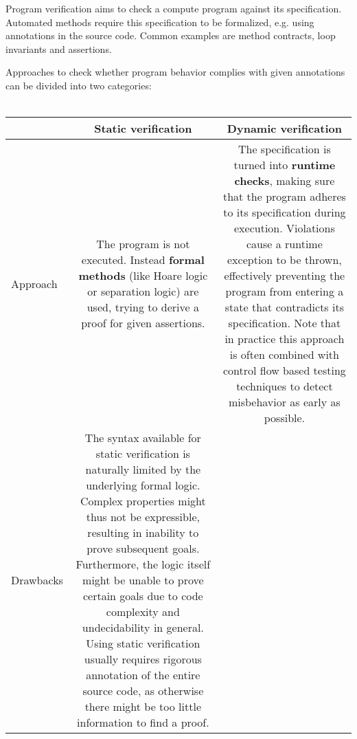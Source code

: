 Program verification aims to check a compute program against its specification.
Automated methods require this specification to be formalized, e.g. using annotations in the source code.
Common examples are method contracts, loop invariants and assertions.

Approaches to check whether program behavior complies with given annotations can be divided into two categories:\\~\\
\begin{tabular}{l | c | c}
     & Static verification & Dynamic verification \\ \hline
    Approach &
    \begin{minipage}{170pt}
        \vspace{3pt}
        The program is not executed. 
        Instead \textbf{formal methods} (like Hoare logic or separation logic) are used, trying to derive a proof for given assertions.
        \vspace{5pt}
    \end{minipage}
    &
    \begin{minipage}{170pt}
        \vspace{3pt}
        The specification is turned into \textbf{runtime checks}, making sure that the program adheres to its specification during execution.
        Violations cause a runtime exception to be thrown, effectively preventing the program from entering a state that contradicts its specification.
        Note that in practice this approach is often combined with control flow based testing techniques to detect misbehavior as early as possible.
        \vspace{5pt}
    \end{minipage}\\\hline
    Drawbacks &
    \begin{minipage}{170pt}
        \vspace{3pt}
        The syntax available for static verification is naturally limited by the underlying formal logic.
        Complex properties might thus not be expressible, resulting in inability to prove subsequent goals.
        Furthermore, the logic itself might be unable to prove certain goals due to code complexity and undecidability in general.
        Using static verification usually requires rigorous annotation of the entire source code, as otherwise there might be too little information to find a proof.

\end{minipage}
\end{tabular}
